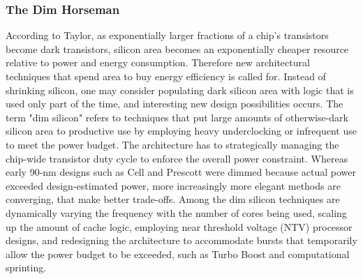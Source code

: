 \subsubsection{The Dim Horseman}
According to Taylor\cite{dark-silicon}, as exponentially larger fractions of a chip’s transistors become dark transistors, silicon area becomes an exponentially cheaper resource relative to power and energy consumption.
Therefore new architectural techniques that spend area to buy energy efficiency is called for.
Instead of shrinking silicon, one may consider populating dark silicon area with logic that is used only part of the time, and interesting new design possibilities occurs.
The term "dim silicon" refers to techniques that put large amounts of otherwise-dark silicon area to productive use by employing heavy underclocking or infrequent use to meet the power budget.
The architecture has to strategically managing the chip-wide transistor duty cycle to enforce the overall power constraint. 
Whereas early 90-nm designs such as Cell and Prescott were dimmed because actual power exceeded design-estimated power, more increasingly more elegant methods are converging, that make better trade-offs.
Among the dim silicon techniques are dynamically varying the frequency with the number of cores being used, scaling up the amount of cache logic, employing near threshold voltage (NTV) processor designs, and redesigning the architecture to accommodate bursts that temporarily allow the power budget to be exceeded, such as Turbo Boost and computational sprinting.


